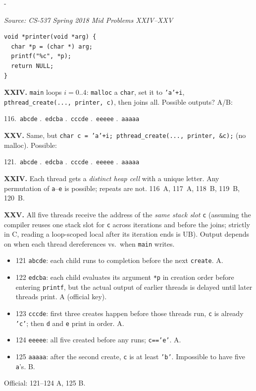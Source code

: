 \documentclass[11pt,a4paper]{article}
\makeatletter
\newcommand{\keepspace}[1]{\par\penalty-100\begingroup
  \setlength{\dimen@}{#1}\dimen@ii\pagegoal\advance\dimen@ii-\pagetotal
  \ifdim\dimen@>\dimen@ii\ifdim\dimen@ii>\z@\vfil\fi\break\fi\endgroup}
\newcounter{qn}[section]
\newenvironment{Qn}[4]{%
  \refstepcounter{qn}\keepspace{7\baselineskip}%
  \begin{tcolorbox}[qboxstyle, title={Q\thesection.\theqn\ \ [#1 \textbar\ #2]\ \ #4}]%
  {\footnotesize\color{g3}\textit{Source: #3}}\par\smallskip%
}{%
  \end{tcolorbox}%
}
\newenvironment{Sol}{%
  \begin{tcolorbox}[sboxstyle, title={Solution}]%
}{%
  \end{tcolorbox}\vspace{0.35em}%
}
\makeatother
\begin{document}
\begin{Qn}{Hard}{Lect 16}{CS-537 Spring 2018 Mid Problems XXIV--XXV}{Printer threads: heap char vs.\ stack char}
\begin{lstlisting}[numbers=none]
void *printer(void *arg) {
  char *p = (char *) arg;
  printf("%c", *p);
  return NULL;
}
\end{lstlisting}

\textbf{XXIV.} \texttt{main} loops $i=0..4$: \texttt{malloc} a \texttt{char}, set it to \texttt{'a'+i}, \texttt{pthread\_create(..., printer, c)}, then joins all. Possible outputs? A/B:

116.~\texttt{abcde} .~\texttt{edcba} .~\texttt{cccde} .~\texttt{eeeee} .~\texttt{aaaaa}

\textbf{XXV.} Same, but \texttt{char c = 'a'+i; pthread\_create(..., printer, \&c);} (no malloc). Possible:

121.~\texttt{abcde} .~\texttt{edcba} .~\texttt{cccde} .~\texttt{eeeee} .~\texttt{aaaaa}
\end{Qn}
\begin{Sol}
\textbf{XXIV.} Each thread gets a \emph{distinct heap cell} with a unique letter. Any permutation of \texttt{a}--\texttt{e} is possible; repeats are not. 116~A, 117~A, 118~B, 119~B, 120~B.

\textbf{XXV.} All five threads receive the address of the \emph{same stack slot} \texttt{c} (assuming the compiler reuses one stack slot for \texttt{c} across iterations and before the joins; strictly in C, reading a loop-scoped local after its iteration ends is UB). Output depends on when each thread dereferences vs.\ when \texttt{main} writes.

\begin{itemize}
\item 121 \texttt{abcde}: each child runs to completion before the next \texttt{create}. A.
\item 122 \texttt{edcba}: each child evaluates its argument \texttt{*p} in creation order before entering \texttt{printf}, but the actual output of earlier threads is delayed until later threads print. A (official key).
\item 123 \texttt{cccde}: first three creates happen before those threads run, \texttt{c} is already \texttt{'c'}; then \texttt{d} and \texttt{e} print in order. A.
\item 124 \texttt{eeeee}: all five created before any runs; \texttt{c=='e'}. A.
\item 125 \texttt{aaaaa}: after the second create, \texttt{c} is at least \texttt{'b'}. Impossible to have five \texttt{a}'s. B.
\end{itemize}

Official: 121--124 A, 125 B.
\end{Sol}
\end{document}
